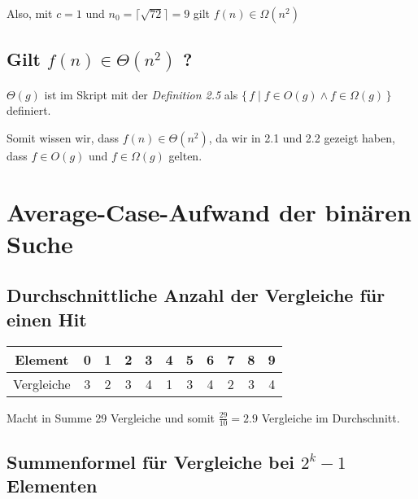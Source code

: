 \documentclass{article}
\begin{document}
\vspace{1em}

\begin{flushleft}
	Also, mit $c = 1$ und $n_0 = \lceil\sqrt{72}\rceil = 9$ gilt $f(n) \in \Omega(n^2)$
\end{flushleft}

\subsection{Gilt $f(n) \in \Theta(n^2)$ ?}

\begin{flushleft}
	$\Theta(g)$ ist im Skript mit der \emph{Definition 2.5} als $\{ \, f \mid f \in O(g) \wedge f \in \Omega(g) \, \}$ definiert.

	\hspace{0.5em}

	Somit wissen wir, dass $f(n) \in \Theta(n^2)$, da wir in 2.1 und 2.2 gezeigt haben, dass $f \in O(g)$ und $f \in \Omega(g)$ gelten.
\end{flushleft}

\section{Average-Case-Aufwand der binären Suche}

\subsection{Durchschnittliche Anzahl der Vergleiche für einen Hit}

\vspace{1em}

\begin{center}
	\begin{tabular}{|c|c|c|c|c|c|c|c|c|c|c|}
		\hline
		Element    & 0 & 1 & 2 & 3 & 4 & 5 & 6 & 7 & 8 & 9 \\
		\hline
		Vergleiche & 3 & 2 & 3 & 4 & 1 & 3 & 4 & 2 & 3 & 4 \\
		\hline
	\end{tabular}
\end{center}

\vspace{1em}

Macht in Summe 29 Vergleiche und somit $\frac{29}{10} = 2.9$ Vergleiche im Durchschnitt.

\subsection{Summenformel für Vergleiche bei $2^k - 1$ Elementen}
\end{document}
